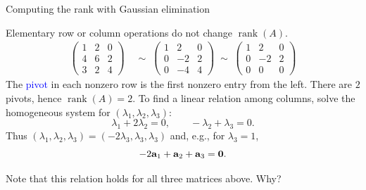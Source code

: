 \documentclass{beamer}
\DeclareMathOperator{\rank}{rank}
\begin{document}
%
% 

\begin{frame}{Computing the rank with Gaussian elimination}
 
Elementary row or column operations do not change $\rank(A)$.
\vskip 6pt
\[
\begin{aligned}
\begin{pmatrix}
1&2&0\\
4&6&2\\
3&2&4
\end{pmatrix}
&\;\sim\;
\begin{pmatrix}
1&2&0\\
0&-2&2\\
0&-4&4
\end{pmatrix}
\;\sim\;
\begin{pmatrix}
1&2&0\\
0&-2&2\\
0&0&0
\end{pmatrix}
\end{aligned}
\]
The \textcolor{blue}{pivot} in each nonzero row is the first nonzero entry from the left.
\vskip 4pt
There are $2$ pivots, hence $\rank(A)=2$.
\vskip 6pt
To find a linear relation among columns, solve the homogeneous system for $(\lambda_1,\lambda_2,\lambda_3)$:
\[
\lambda_1+2\lambda_2=0,\qquad -\lambda_2+\lambda_3=0.
\]
Thus $(\lambda_1,\lambda_2,\lambda_3)=(-2\lambda_3,\lambda_3,\lambda_3)$ and, e.g., for $\lambda_3=1$,
\[
-2{\bf a}_1+{\bf a}_2+{\bf a}_3={\bf 0}.
\]
\vspace{-9mm}
 \begin{alertblock}{}
 	Note that this relation holds for all three matrices above. Why?
 \end{alertblock}
\end{frame}
\end{document}

